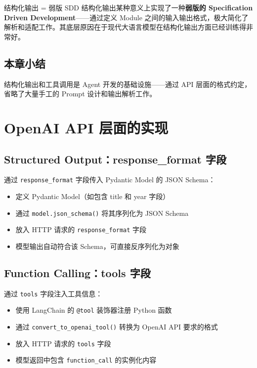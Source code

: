 \documentclass[a4paper]{article}
\begin{document}
\begin{importantbox}{结构化输出 = 弱版 SDD}
结构化输出某种意义上实现了一种\textbf{弱版的 Specification Driven Development}——通过定义 Module 之间的输入输出格式，极大简化了解析和适配工作。其底层原因在于现代大语言模型在结构化输出方面已经训练得非常好。
\end{importantbox}

\subsection{本章小结}

结构化输出和工具调用是 Agent 开发的基础设施——通过 API 层面的格式约定，省略了大量手工的 Prompt 设计和输出解析工作。

\section{OpenAI API 层面的实现}

\subsection{Structured Output：response\_format 字段}

通过 \texttt{response\_format} 字段传入 Pydantic Model 的 JSON Schema：

\begin{itemize}
    \item 定义 Pydantic Model（如包含 title 和 year 字段）
    \item 通过 \texttt{model.json\_schema()} 将其序列化为 JSON Schema
    \item 放入 HTTP 请求的 \texttt{response\_format} 字段
    \item 模型输出自动符合该 Schema，可直接反序列化为对象
\end{itemize}

\subsection{Function Calling：tools 字段}

通过 \texttt{tools} 字段注入工具信息：

\begin{itemize}
    \item 使用 LangChain 的 \texttt{@tool} 装饰器注册 Python 函数
    \item 通过 \texttt{convert\_to\_openai\_tool()} 转换为 OpenAI API 要求的格式
    \item 放入 HTTP 请求的 \texttt{tools} 字段
    \item 模型返回中包含 \texttt{function\_call} 的实例化内容
\end{itemize}
\end{document}
